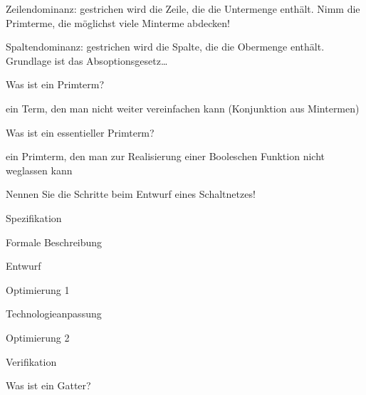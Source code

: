 \documentclass
[
  draft    = true,
  fontsize = 11pt,
  parskip  = half-,
  BCOR     = 0pt,
  DIV      = 11,
  ngerman,
  dvipsnames
]
{scrartcl}
\begin{document}
\begin{mytemize}
        \begin{achim}
          \begin{mytemize}
            \item Zeilendominanz: gestrichen wird die Zeile, die die Untermenge enthält.
                  \glqq Nimm die Primterme, die möglichst viele Minterme abdecken!\grqq
            \item Spaltendominanz: gestrichen wird die Spalte, die die Obermenge enthält.
                  Grundlage ist das Absoptionsgesetz\ldots
          \end{mytemize}
        \end{achim}
  \item Was ist ein Primterm?
        \begin{achim}
          \begin{mytemize}
            \item ein Term, den man nicht weiter vereinfachen kann (Konjunktion aus Mintermen)
          \end{mytemize}
        \end{achim}
  \item Was ist ein essentieller Primterm?
        \begin{achim}
          \begin{mytemize}
            \item ein Primterm, den man zur Realisierung einer Booleschen Funktion nicht weglassen kann
          \end{mytemize}
        \end{achim}
  \item Nennen Sie die Schritte beim Entwurf eines Schaltnetzes!
        \begin{achim}
          \begin{mytemize}
            \item Spezifikation
            \item Formale Beschreibung
            \item Entwurf
            \item Optimierung 1
            \item Technologieanpassung
            \item Optimierung 2
            \item Verifikation
          \end{mytemize}
        \end{achim}
  \item Was ist ein Gatter?
        \begin{achim}

\end{achim}
\end{mytemize}
\end{document}
